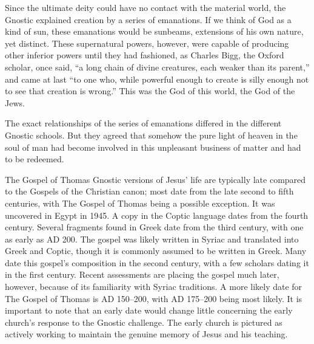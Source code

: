 Since the ultimate deity could have no contact with the material world, the Gnostic explained
creation by a series of emanations. If we think of God as a kind of sun, these emanations would be
sunbeams, extensions of his own nature, yet distinct. These supernatural powers, however, were
capable of producing other inferior powers until they had fashioned, as Charles Bigg, the Oxford
scholar, once said, “a long chain of divine creatures, each weaker than its parent,” and came at
last “to one who, while powerful enough to create is silly enough not to see that creation is
wrong.” This was the God of this world, the God of the Jews.

The exact relationships of the series of emanations differed in the different Gnostic schools. But
they agreed that somehow the pure light of heaven in the soul of man had become involved in this
unpleasant business of matter and had to be redeemed.

\begin{sidebar}{The Gospel of Thomas}
Gnostic versions of Jesus’ life are typically late compared to the Gospels of the Christian canon;
most date from the late second to fifth centuries, with The Gospel of Thomas being a possible
exception. It was uncovered in Egypt in 1945. A copy in the Coptic language dates from the fourth
century. Several fragments found in Greek date from the third century, with one as early as AD 200.
The gospel was likely written in Syriac and translated into Greek and Coptic, though it is commonly
assumed to be written in Greek. Many date this gospel’s composition in the second century, with a
few scholars dating it in the first century. Recent assessments are placing the gospel much later,
however, because of its familiarity with Syriac traditions. A more likely date for The Gospel of
Thomas is AD 150–200, with AD 175–200 being most likely. It is important to note that an early date
would change little concerning the early church’s response to the Gnostic challenge. The early
church is pictured as actively working to maintain the genuine memory of Jesus and his teaching.
\end{sidebar}

